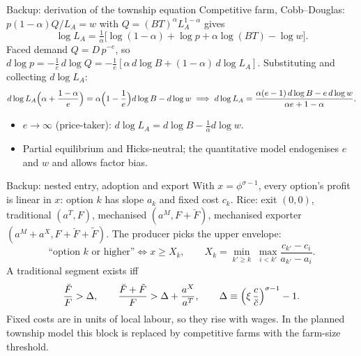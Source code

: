 \documentclass[10pt,aspectratio=169]{beamer}
\begin{document}
\begin{frame}{Backup: derivation of the township equation}
  \small
  Competitive farm, Cobb--Douglas: $p(1-\alpha)Q/L_A=w$ with $Q=(BT)^\alpha L_A^{1-\alpha}$
  gives
  \begin{equation*}
    \log L_A=\tfrac1\alpha\bigl[\log(1-\alpha)+\log p+\alpha\log(BT)-\log w\bigr].
  \end{equation*}
  Faced demand $Q=D\,p^{-e}$, so $d\log p=-\frac1e\,d\log Q=-\frac1e[\alpha\,d\log B+(1-\alpha)\,d\log L_A]$.
  Substituting and collecting $d\log L_A$:
  \begin{equation*}
    d\log L_A\Bigl(\alpha+\frac{1-\alpha}{e}\Bigr)=\alpha\Bigl(1-\frac1e\Bigr)d\log B-d\log w
    \;\Longrightarrow\;
    d\log L_A=\frac{\alpha(e-1)\,d\log B-e\,d\log w}{\alpha e+1-\alpha}.
  \end{equation*}
  \begin{itemize}
    \item $e\to\infty$ (price-taker): $d\log L_A=d\log B-\frac1\alpha d\log w$.
    \item Partial equilibrium and Hicks-neutral; the quantitative model endogenises $e$
          and $w$ and allows factor bias.
  \end{itemize}
\end{frame}

\begin{frame}{Backup: nested entry, adoption and export}
  \small
  With $x=\phi^{\sigma-1}$, every option's profit is linear in $x$: option $k$ has slope
  $a_k$ and fixed cost $c_k$. Rice: exit $(0,0)$, traditional $(a^T,F)$, mechanised
  $(a^M,F+\breve F)$, mechanised exporter $(a^M+a^X,F+\breve F+\tilde F)$. The producer
  picks the upper envelope:
  \begin{equation*}
    \text{``option }k\text{ or higher''}\iff x\ge X_k,\qquad
    X_k=\min_{k'\ge k}\;\max_{i<k'}\frac{c_{k'}-c_i}{a_{k'}-a_i}.
  \end{equation*}
  A traditional segment exists iff
  \begin{equation*}
    \frac{\breve F}{F}>\Delta,\qquad
    \frac{\breve F+\tilde F}{F}>\Delta+\frac{a^X}{a^T},\qquad
    \Delta\equiv\Bigl(\xi\,\frac{c}{\breve c}\Bigr)^{\sigma-1}-1 .
  \end{equation*}
  Fixed costs are in units of local labour, so they rise with wages. In the planned
  township model this block is replaced by competitive farms with the farm-size threshold.
\end{frame}
\end{document}
